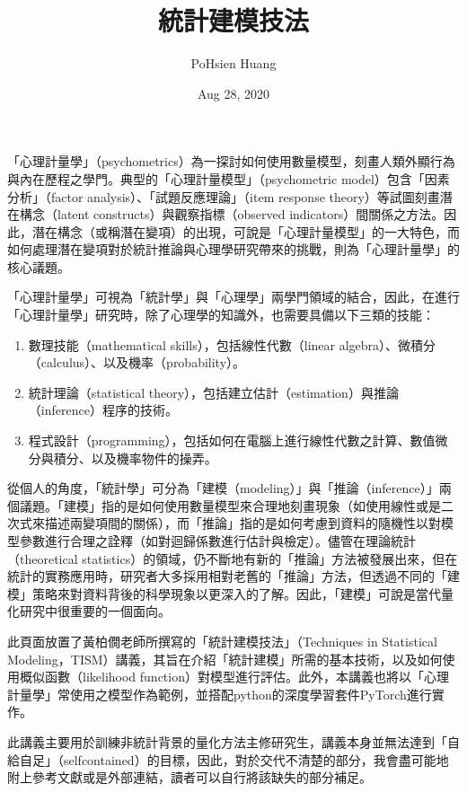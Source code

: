\documentclass[letterpaper,10pt,english]{sphinxmanual}
\title{統計建模技法}
\date{Aug 28, 2020}
\author{Po\sphinxhyphen{}Hsien Huang}
\begin{document}
\pagestyle{empty}
\sphinxmaketitle
\pagestyle{plain}
\sphinxtableofcontents
\pagestyle{normal}
\label{\detokenize{intro::doc}}


「心理計量學」（psychometrics）為一探討如何使用數量模型，刻畫人類外顯行為與內在歷程之學門。典型的「心理計量模型」（psychometric model）包含「因素分析」（factor analysis）、「試題反應理論」（item response theory）等試圖刻畫潛在構念（latent constructs）與觀察指標（observed indicators）間關係之方法。因此，潛在構念（或稱潛在變項）的出現，可說是「心理計量模型」的一大特色，而如何處理潛在變項對於統計推論與心理學研究帶來的挑戰，則為「心理計量學」的核心議題。

「心理計量學」可視為「統計學」與「心理學」兩學門領域的結合，因此，在進行「心理計量學」研究時，除了心理學的知識外，也需要具備以下三類的技能：
\begin{enumerate}
%
\item {} 
數理技能（mathematical skills），包括線性代數（linear algebra）、微積分（calculus）、以及機率（probability）。

\item {} 
統計理論（statistical theory），包括建立估計（estimation）與推論（inference）程序的技術。

\item {} 
程式設計（programming），包括如何在電腦上進行線性代數之計算、數值微分與積分、以及機率物件的操弄。

\end{enumerate}

從個人的角度，「統計學」可分為「建模（modeling）」與「推論（inference）」兩個議題。「建模」指的是如何使用數量模型來合理地刻畫現象（如使用線性或是二次式來描述兩變項間的關係），而「推論」指的是如何考慮到資料的隨機性以對模型參數進行合理之詮釋（如對迴歸係數進行估計與檢定）。儘管在理論統計（theoretical statistics）的領域，仍不斷地有新的「推論」方法被發展出來，但在統計的實務應用時，研究者大多採用相對老舊的「推論」方法，但透過不同的「建模」策略來對資料背後的科學現象以更深入的了解。因此，「建模」可說是當代量化研究中很重要的一個面向。

此頁面放置了黃柏僩老師所撰寫的「統計建模技法」（Techniques in Statistical Modeling，TISM）講義，其旨在介紹「統計建模」所需的基本技術，以及如何使用概似函數（likelihood function）對模型進行評估。此外，本講義也將以「心理計量學」常使用之模型作為範例，並搭配python的深度學習套件PyTorch進行實作。

此講義主要用於訓練非統計背景的量化方法主修研究生，講義本身並無法達到「自給自足」（self\sphinxhyphen{}contained）的目標，因此，對於交代不清楚的部分，我會盡可能地附上參考文獻或是外部連結，讀者可以自行將該缺失的部分補足。
\end{document}
